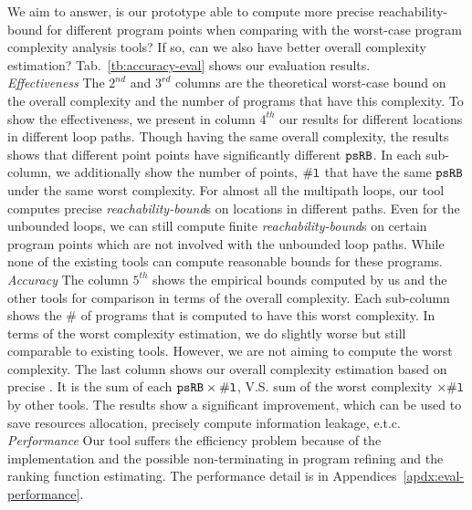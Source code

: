 We aim to answer, is our prototype able to compute more precise reachability-bound for different program points when comparing with the worst-case program
complexity analysis tools? If so, can we also have better overall complexity estimation?
Tab.~\ref{tb:accuracy-eval} shows our evaluation results.
\\
\emph{Effectiveness}
\newcommand{\pointnum}{\kw{\# l}}
The $2^{nd}$ and $3^{rd}$ columns are the theoretical worst-case bound on the overall complexity and the number of programs that have this complexity.
To show the effectiveness, 
we present in column $4^{th}$ our results for different locations in different loop paths. 
Though having the same overall complexity, the results shows that different point points have significantly different $\mathtt{psRB}$.
In each sub-column, we additionally show the number of points, $\pointnum$ that have the same $\mathtt{psRB}$ under the same worst complexity.
For almost all the multipath loops, our tool computes precise \emph{reachability-bound}s on locations in different paths.
Even for the unbounded loops, we can still compute finite \emph{reachability-bound}s on certain program points which are not involved with the unbounded loop paths.
While none of the existing tools can compute reasonable bounds for these programs.
\\
\emph{Accuracy} 
The column $5^{th}$ shows the empirical bounds computed by us and the other tools for comparison in terms of the overall complexity. Each sub-column shows the $\#$ of programs that is computed to have this worst complexity.
In terms of the worst complexity estimation, we do slightly worse but still comparable to existing tools. However, we are not aiming to compute the worst complexity.
The last column shows our overall complexity estimation based on precise {\THESYSTEM}.
It is the sum of each $\psRB \times \pointnum$, V.S. sum of the worst complexity $\times \pointnum$  by other tools.
The results show a significant improvement, which can be used to save resources allocation,
precisely compute information leakage, e.t.c.
\\
\emph{Performance}
Our tool suffers the efficiency problem because of the implementation and the possible non-terminating in program refining and the ranking function estimating.
The performance detail is in Appendices~\ref{apdx:eval-performance}.
